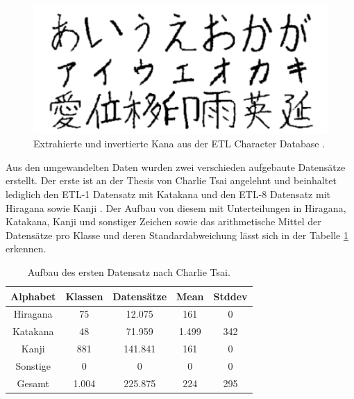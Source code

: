 \documentclass[twoside,a4paper]{IEEEtran}
\begin{document}
\begin{figure}[!htb]
	\includegraphics[width=\columnwidth]{kana}
	\caption{Extrahierte und invertierte Kana aus der ETL Character Database \cite[S.1]{RHC}.}
	\label{kana}
\end{figure}

Aus den umgewandelten Daten wurden zwei verschieden aufgebaute Datensätze erstellt. Der erste ist an der Thesis von Charlie Tsai angelehnt und beinhaltet lediglich den ETL-1 Datensatz mit Katakana und den ETL-8 Datensatz mit Hiragana sowie Kanji \cite[S.3]{RHC}. Der Aufbau von diesem mit Unterteilungen in Hiragana, Katakana, Kanji und sonstiger Zeichen sowie das arithmetische Mittel der Datensätze pro Klasse und deren Standardabweichung lässt sich in der Tabelle \ref{data_tsai} erkennen.
\begin{table}[!htb]
	\caption{Aufbau des ersten Datensatz nach Charlie Tsai.}
	\label{data_tsai}
	\centering
	\begin{tabular}{|c|c|c|c|c|}
		\hline
		Alphabet & Klassen & Datensätze & Mean & Stddev\\
		\hline
		\hline
		Hiragana & 75 & 12.075 & 161 & 0\\
		\hline 
		Katakana & 48 & 71.959 & 1.499 & 342\\
		\hline
		Kanji & 881 & 141.841 & 161 & 0\\
		\hline
		Sonstige & 0 & 0 & 0 & 0\\
		\hline
		\hline
		Gesamt & 1.004 & 225.875 & 224 & 295\\
		\hline
	\end{tabular}
\end{table}
\end{document}
